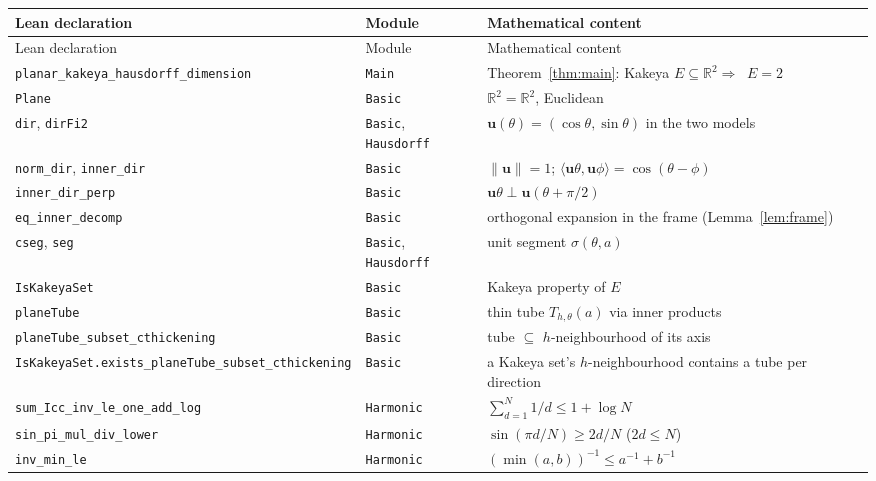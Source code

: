 \documentclass[11pt,a4paper]{article}
\newcommand{\R}{\mathbb{R}}
\DeclareMathOperator{\Hdim}{dim_H}
\newcommand{\Plane}{\ensuremath{\mathbb{R}^{2}}}     %
\newcommand{\dir}{\mathbf{u}}                        %
\newcommand{\tseg}{\sigma}                           %
\newcommand{\tube}{T}                                %
\newcommand{\lname}[1]{\texttt{#1}}                  %
\newcommand{\lb}{\_\allowbreak}                      %
\theoremstyle{definition}
\theoremstyle{remark}
\begin{document}
\begingroup
\footnotesize
\setlength{\LTleft}{0pt}
\setlength{\tabcolsep}{5pt}
\begin{longtable}{@{}>{\raggedright\arraybackslash}p{}
                    >{\raggedright\arraybackslash}p{}
                    >{\raggedright\arraybackslash}p{}@{}}
\toprule
Lean declaration & Module & Mathematical content \\
\midrule
\endfirsthead
\toprule
Lean declaration & Module & Mathematical content \\
\midrule
\endhead
\bottomrule
\endfoot
\lname{planar\lb kakeya\lb hausdorff\lb dimension} & \lname{Main} &
  Theorem~\ref{thm:main}: Kakeya $E\subseteq\Plane \Rightarrow \Hdim E = 2$ \\
\midrule
\lname{Plane} & \lname{Basic} & $\Plane=\R^2$, Euclidean \\
\lname{dir}, \lname{dirFi2} & \lname{Basic}, \lname{Hausdorff} &
  $\dir(\theta)=(\cos\theta,\sin\theta)$ in the two models \\
\lname{norm\lb dir}, \lname{inner\lb dir} & \lname{Basic} &
  $\|\dir\|=1$; $\langle\dir\theta,\dir\phi\rangle=\cos(\theta-\phi)$ \\
\lname{inner\lb dir\lb perp} & \lname{Basic} & $\dir\theta\perp\dir(\theta+\pi/2)$ \\
\lname{eq\lb inner\lb decomp} & \lname{Basic} &
  orthogonal expansion in the frame (Lemma~\ref{lem:frame}) \\
\lname{cseg}, \lname{seg} & \lname{Basic}, \lname{Hausdorff} &
  unit segment $\tseg(\theta,a)$ \\
\lname{IsKakeyaSet} & \lname{Basic} & Kakeya property of $E$ \\
\lname{planeTube} & \lname{Basic} & thin tube $\tube_{h,\theta}(a)$ via inner products \\
\lname{planeTube\lb subset\lb cthickening} & \lname{Basic} &
  tube $\subseteq$ $h$-neighbourhood of its axis \\
\lname{IsKakeyaSet.exists\lb planeTube\lb subset\lb cthickening} & \lname{Basic} &
  a Kakeya set's $h$-neighbourhood contains a tube per direction \\
\midrule
\lname{sum\lb Icc\lb inv\lb le\lb one\lb add\lb log} & \lname{Harmonic} &
  $\sum_{d=1}^N 1/d \le 1+\log N$ \\
\lname{sin\lb pi\lb mul\lb div\lb lower} & \lname{Harmonic} &
  $\sin(\pi d/N)\ge 2d/N$ ($2d\le N$) \\
\lname{inv\lb min\lb le} & \lname{Harmonic} & $(\min(a,b))^{-1}\le a^{-1}+b^{-1}$ \\

\end{longtable}
\end{document}
